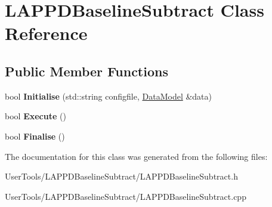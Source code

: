 \hypertarget{classLAPPDBaselineSubtract}{
\section{LAPPDBaselineSubtract Class Reference}
\label{classLAPPDBaselineSubtract}
}
\subsection*{Public Member Functions}
\begin{DoxyCompactItemize}
\item 
\hypertarget{classLAPPDBaselineSubtract_a9173849be0de9676949ce9e3094c0c73}{
bool {\bfseries Initialise} (std::string configfile, \hyperlink{classDataModel}{DataModel} \&data)}
\label{classLAPPDBaselineSubtract_a9173849be0de9676949ce9e3094c0c73}

\item 
\hypertarget{classLAPPDBaselineSubtract_ae2ea261ef543fa9b924a1504a250b744}{
bool {\bfseries Execute} ()}
\label{classLAPPDBaselineSubtract_ae2ea261ef543fa9b924a1504a250b744}

\item 
\hypertarget{classLAPPDBaselineSubtract_a784d6efcf77a1cb4ad27b571f3a55d8d}{
bool {\bfseries Finalise} ()}
\label{classLAPPDBaselineSubtract_a784d6efcf77a1cb4ad27b571f3a55d8d}

\end{DoxyCompactItemize}


The documentation for this class was generated from the following files:\begin{DoxyCompactItemize}
\item 
UserTools/LAPPDBaselineSubtract/LAPPDBaselineSubtract.h\item 
UserTools/LAPPDBaselineSubtract/LAPPDBaselineSubtract.cpp\end{DoxyCompactItemize}
